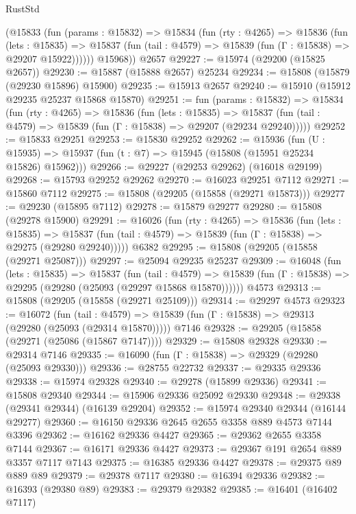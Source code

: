 \begin{lexlean}{RustStd}
\begin{coremodule}
        (@15833
          (fun (params : @15832) =>
          @15834
            (fun (rty : @4265) =>
            @15836
              (fun (lets : @15835) =>
              @15837 (fun (tail : @4579) => @15839 (fun (Γ : @15838) => @29207 @15922))))))
        @15968))
    @2657
@29227 := @15974 (@29200 (@15825 @2657))
@29230 := @15887 (@15888 @2657) @25234
@29234 := @15808 (@15879 (@29230 @15896) @15900)
@29235 := @15913 @2657
@29240 := @15910 (@15912 @29235 @25237 @15868 @15870)
@29251 := fun (params : @15832) =>
  @15834
    (fun (rty : @4265) =>
    @15836
      (fun (lets : @15835) =>
      @15837 (fun (tail : @4579) => @15839 (fun (Γ : @15838) => @29207 (@29234 @29240)))))
@29252 := @15833 @29251
@29253 := @15830 @29252
@29262 := @15936
    (fun (U : @15935) => @15937 (fun (t : @7) => @15945 (@15808 (@15951 @25234 @15826) @15962)))
@29266 := @29227 (@29253 @29262) (@16018 @29199)
@29268 := @15793 @29252 @29262
@29270 := @16023 @29251 @7112
@29271 := @15860 @7112
@29275 := @15808 (@29205 (@15858 (@29271 @15873)))
@29277 := @29230 (@15895 @7112)
@29278 := @15879 @29277
@29280 := @15808 (@29278 @15900)
@29291 := @16026
    (fun (rty : @4265) =>
    @15836
      (fun (lets : @15835) =>
      @15837 (fun (tail : @4579) => @15839 (fun (Γ : @15838) => @29275 (@29280 @29240)))))
    @6382
@29295 := @15808 (@29205 (@15858 (@29271 @25087)))
@29297 := @25094 @29235 @25237
@29309 := @16048
    (fun (lets : @15835) =>
    @15837
      (fun (tail : @4579) =>
      @15839 (fun (Γ : @15838) => @29295 (@29280 (@25093 (@29297 @15868 @15870))))))
    @4573
@29313 := @15808 (@29205 (@15858 (@29271 @25109)))
@29314 := @29297 @4573
@29323 := @16072
    (fun (tail : @4579) => @15839 (fun (Γ : @15838) => @29313 (@29280 (@25093 (@29314 @15870)))))
    @7146
@29328 := @29205 (@15858 (@29271 (@25086 (@15867 @7147))))
@29329 := @15808 @29328
@29330 := @29314 @7146
@29335 := @16090 (fun (Γ : @15838) => @29329 (@29280 (@25093 @29330)))
@29336 := @28755 @22732
@29337 := @29335 @29336
@29338 := @15974 @29328
@29340 := @29278 (@15899 @29336)
@29341 := @15808 @29340
@29344 := @15906 @29336 @25092 @29330
@29348 := @29338 (@29341 @29344) (@16139 @29204)
@29352 := @15974 @29340 @29344 (@16144 @29277)
@29360 := @16150 @29336 @2645 @2655 @3358 @889 @4573 @7144 @3396
@29362 := @16162 @29336 @4427
@29365 := @29362 @2655 @3358 @7144
@29367 := @16171 @29336 @4427
@29373 := @29367 @191 @2654 @889 @3357 @7117 @7143
@29375 := @16385 @29336 @4427
@29378 := @29375 @89 @889 @89
@29379 := @29378 @7117
@29380 := @16394 @29336
@29382 := @16393 (@29380 @89)
@29383 := @29379 @29382
@29385 := @16401 (@16402 @7117)

\end{coremodule}
\end{lexlean}
